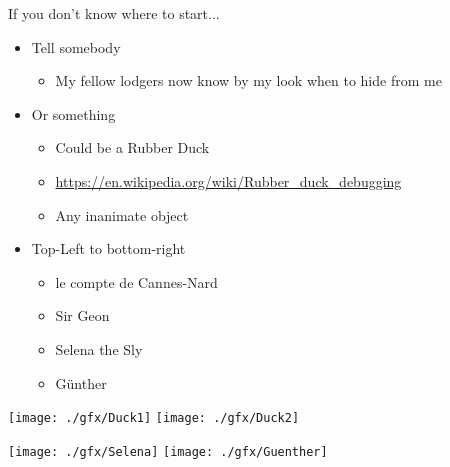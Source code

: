 \begin{frame}{If you don't know where to start...}
%
\begin{center}
	\begin{minipage}{.4\linewidth}
		\begin{itemize}
		\item Tell somebody
			\begin{itemize}
			\item My fellow lodgers now know by my look when to hide from me
			\end{itemize}
		\item Or something
			\begin{itemize}
			\item Could be a Rubber Duck
			\item \url{https://en.wikipedia.org/wiki/Rubber_duck_debugging}
			\item Any inanimate object
			\end{itemize}
		\item Top-Left to bottom-right
			\begin{itemize}
			\item le compte de Cannes-Nard
			\item Sir Geon
			\item Selena the Sly
			\item Günther
			\end{itemize}
		\end{itemize}
	\end{minipage}
	\hspace{3em}
	\begin{minipage}{.5\linewidth}
		\begin{minipage}{\linewidth}
		\texttt{[image: ./gfx/Duck1]}
		\hspace{1em}
		\texttt{[image: ./gfx/Duck2]}
		\end{minipage}
		
		\begin{minipage}{\linewidth}
		\texttt{[image: ./gfx/Selena]}
		\hspace{1em}
		\texttt{[image: ./gfx/Guenther]}
		\end{minipage}
	\end{minipage}
\end{center}
%
\end{frame}



